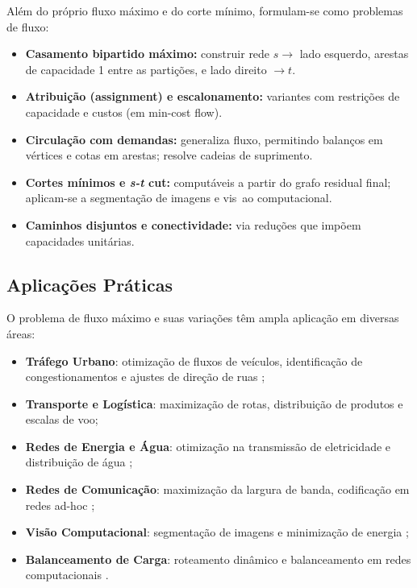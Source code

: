 \documentclass[12pt]{article}
\begin{document}
Além do próprio fluxo máximo e do corte mínimo, formulam-se como problemas de fluxo: 

\begin{itemize} 
\item \textbf{Casamento bipartido máximo:} construir rede $s\to$ lado esquerdo, arestas de capacidade 1 entre as partições, e lado direito $\to t$. 
\item \textbf{Atribuição (assignment) e escalonamento:} variantes com restrições de capacidade e custos (em min-cost flow). 
\item \textbf{Circulação com demandas:} generaliza fluxo, permitindo balanços em vértices e cotas em arestas; resolve cadeias de suprimento. 
\item \textbf{Cortes mínimos e \emph{s-t} cut:} computáveis a partir do grafo residual final; aplicam-se a segmentação de imagens e vis~ao computacional. 
\item \textbf{Caminhos disjuntos e conectividade:} via reduções que impõem capacidades unitárias. \end{itemize}



\subsection{Aplicações Práticas}

O problema de fluxo máximo e suas variações têm ampla aplicação em diversas áreas:


\begin{itemize}
    \item \textbf{Tráfego Urbano}: otimização de fluxos de veículos, identificação de congestionamentos e ajustes de direção de ruas \cite{saidane2002traffic, gupta2016traffic, dolgopolov2019traffic, gong2022traffic, iemini1994dynamic};
    \item \textbf{Transporte e Logística}: maximização de rotas, distribuição de produtos e escalas de voo;
    \item \textbf{Redes de Energia e Água}: otimização na transmissão de eletricidade e distribuição de água \cite{bulut2021optimization};
    \item \textbf{Redes de Comunicação}: maximização da largura de banda, codificação em redes ad-hoc \cite{neto2015communication, zhang2005ad};
    \item \textbf{Visão Computacional}: segmentação de imagens e minimização de energia \cite{boykov2001};
    \item \textbf{Balanceamento de Carga}: roteamento dinâmico e balanceamento em redes computacionais \cite{tsiaka2008load, peijun2011routing}.
\end{itemize}
\end{document}

